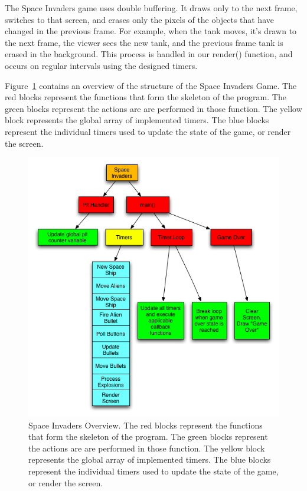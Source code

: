 \documentclass[11pt,letter,oneside]{report}
\begin{document}
The Space Invaders game uses double buffering. It draws only to the next frame, switches to that screen, and erases only the pixels of the objects that have changed in the previous frame. For example, when the tank moves, it's drawn to the next frame, the viewer sees the new tank, and the previous frame tank is erased in the background. This process is handled in our render() function, and occurs on regular intervals using the designed timers.

Figure~\ref{fig:overview} contains an overview of the structure of the Space Invaders Game. The red blocks represent the functions that form the skeleton of the program. The green blocks represent the actions are are performed in those function. The yellow block represents the global array of implemented timers. The blue blocks represent the individual timers used to update the state of the game, or render the screen.
\begin{figure}[ht]
\centering
\includegraphics[scale=.80]{Space_Invaders_Overview.jpg}
\caption{Space Invaders Overview. The red blocks represent the functions that form the skeleton of the program. The green blocks represent the actions are are performed in those function. The yellow block represents the global array of implemented timers. The blue blocks represent the individual timers used to update the state of the game, or render the screen.}
\label{fig:overview}
\end{figure}
\end{document}
